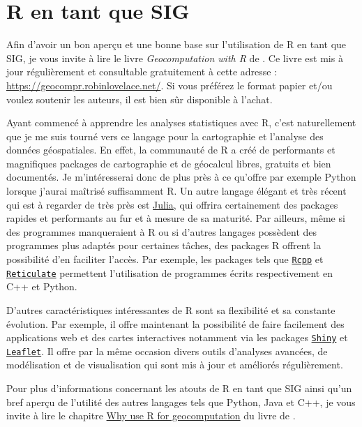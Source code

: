 \documentclass[
  french,
]{book}
\begin{document}
\hypertarget{R-sig}{%
\section{R en tant que SIG}\label{R-sig}}

Afin d'avoir un bon aperçu et une bonne base sur l'utilisation de R en tant que
SIG, je vous invite à lire le livre \emph{Geocomputation with R} de \citet{geocomputation}.
Ce livre est mis à jour régulièrement et consultable gratuitement à cette
adresse : \url{https://geocompr.robinlovelace.net/}. Si vous préférez le format
papier et/ou voulez soutenir les auteurs, il est bien sûr disponible à l'achat.

Ayant commencé à apprendre les analyses statistiques avec R, c'est naturellement
que je me suis tourné vers ce langage pour la cartographie et l'analyse des
données géospatiales. En effet, la communauté de R a créé de performants et
magnifiques packages de cartographie et de géocalcul libres, gratuits et bien
documentés. Je m'intéresserai donc de plus près à ce qu'offre par exemple Python
lorsque j'aurai maîtrisé suffisamment R. Un autre langage élégant et très récent
qui est à regarder de très près est \href{https://julialang.org/}{Julia}, qui offrira
certainement des packages rapides et performants au fur et à mesure de sa
maturité. Par ailleurs, même si des programmes manqueraient à R ou si d'autres
langages possèdent des programmes plus adaptés pour certaines tâches, des
packages R offrent la possibilité d'en faciliter l'accès. Par exemple, les
packages tels que \href{https://github.com/RcppCore/Rcpp}{\texttt{Rcpp}} et
\href{https://rstudio.github.io/reticulate/}{\texttt{Reticulate}} permettent l'utilisation
de programmes écrits respectivement en C++ et Python.

D'autres caractéristiques intéressantes de R sont sa flexibilité et sa constante
évolution. Par exemple, il offre maintenant la possibilité de faire facilement
des applications web et des cartes interactives notamment via les packages
\href{https://shiny.rstudio.com/}{\texttt{Shiny}} et
\href{https://rstudio.github.io/leaflet/}{\texttt{Leaflet}}. Il offre par la même occasion
divers outils d'analyses avancées, de modélisation et de visualisation qui sont
mis à jour et améliorés régulièrement.

Pour plus d'informations concernant les atouts de R en tant que SIG ainsi qu'un
bref aperçu de l'utilité des autres langages tels que Python, Java et C++, je
vous invite à lire le chapitre \href{https://geocompr.robinlovelace.net/intro.html\#why-use-r-for-geocomputation}{Why use R for
geocomputation}
du livre de \citet{geocomputation}.
\end{document}
